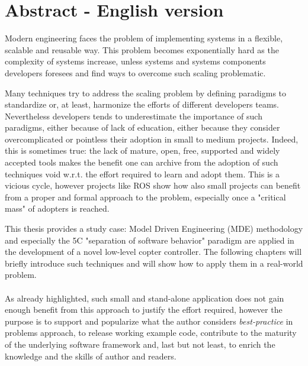 

\begingroup
\let\clearpage\relax
\let\cleardoublepage\relax
\let\cleardoublepage\relax

\chapter*{Abstract  - English version}
Modern engineering faces the problem of implementing systems in a flexible, scalable and reusable way. This problem becomes exponentially hard as the complexity of systems increase, unless systems and systems components developers foresees and find ways to overcome such scaling problematic.

Many techniques try to address the scaling problem by defining paradigms to standardize or, at least, harmonize the efforts of different developers teams. Nevertheless developers tends to underestimate the importance of such paradigms, either because of lack of education, either because they consider overcomplicated or pointless their adoption in small to medium projects. Indeed, this is sometimes true: the lack of mature, open, free, supported and widely accepted tools makes the benefit one can archive from the adoption of such techniques void w.r.t. the effort required to learn and adopt them. This is a vicious cycle, however projects like ROS
show how also small projects can benefit from a proper and formal approach to the problem, especially once a "critical mass" of adopters is reached.

This thesis provides a study case: Model Driven Engineering (MDE) methodology and especially the 5C "separation of software behavior" paradigm are applied in the development of a novel low-level copter controller. The following chapters will briefly introduce such techniques and will show how to apply them in a real-world problem.
\\
\\
As already highlighted, such small and stand-alone application does not gain enough benefit from this approach to justify the effort required, however the purpose is to support and popularize what the author considers \emph{best-practice} in problems approach, to release working example code, contribute to the maturity of the underlying software framework and, last but not least, to enrich the knowledge and the skills of author and readers.

\endgroup			

\vfill
